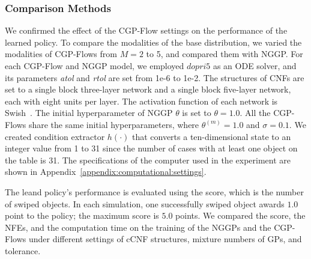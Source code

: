 \documentclass[sn-mathphys-num]{sn-jnl}
\begin{document}
\subsubsection{Comparison Methods}
We confirmed the effect of the CGP-Flow settings on the performance of the learned policy.
To compare the modalities of the base distribution, we varied the modalities of CGP-Flows from $M=2$ to 5, and compared them with NGGP.
For each CGP-Flow and NGGP model, we employed $\textit{dopri5}$ as an ODE solver, and its parameters \textit{atol} and \textit{rtol} are set from 1e-6 to 1e-2.
The structures of CNFs are set to a single block three-layer network and a single block five-layer network, each with eight units per layer.
The activation function of each network is Swish~\cite{ramachandran2017searching}.
The initial hyperparameter of NGGP $\theta$ is set to $\theta=1.0$.
All the CGP-Flows share the same initial hyperparameters, where $\theta^{(m)}=1.0$ and $\sigma=0.1$.
We created condition extractor $h(\cdot)$ that converts a ten-dimensional state to an integer value from 1 to 31 since the number of cases with at least one object on the table is 31.
The specifications of the computer used in the experiment are shown in Appendix~\ref{appendix:computational:settings}.

The leand policy's performance is evaluated using the score, which is the number of swiped objects.
In each simulation, one successfully swiped object awards $1.0$ point to the policy; the maximum score is $5.0$ points.
We compared the score, the NFEs, and the computation time on the training of the NGGPs and the CGP-Flows under different settings of cCNF structures, mixture numbers of GPs, and tolerance.
\end{document}
